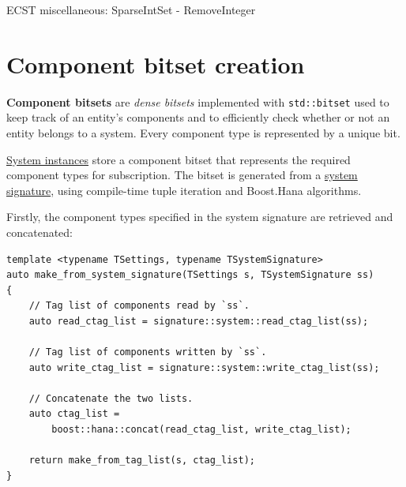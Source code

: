 \documentclass[twoside, 12pt, a4paper, openright]{book}
\begin{document}
\begin{algorithm}[H]

\caption{ECST miscellaneous: SparseIntSet - RemoveInteger}
\footnotesize



\end{algorithm}

\hypertarget{appendix_component_bitset_creation}{\section{Component
bitset creation}\label{appendix_component_bitset_creation}}

\textbf{Component bitsets} are \emph{dense bitsets} implemented with
\texttt{std::bitset}
used to keep track of an entity's components and to efficiently check
whether or not an entity belongs to a system. Every component type is
represented by a unique bit.

\protect\hyperlink{storage_system}{System instances} store a component
bitset that represents the required component types for subscription.
The bitset is generated from a \protect\hyperlink{system_sigs}{system
signature}, using compile-time tuple iteration and Boost.Hana
algorithms.

Firstly, the component types specified in the system signature are
retrieved and concatenated:

\begin{verbatim}
template <typename TSettings, typename TSystemSignature>
auto make_from_system_signature(TSettings s, TSystemSignature ss)
{
    // Tag list of components read by `ss`.
    auto read_ctag_list = signature::system::read_ctag_list(ss);

    // Tag list of components written by `ss`.
    auto write_ctag_list = signature::system::write_ctag_list(ss);

    // Concatenate the two lists.
    auto ctag_list =
        boost::hana::concat(read_ctag_list, write_ctag_list);

    return make_from_tag_list(s, ctag_list);
}
\end{verbatim}
\end{document}
